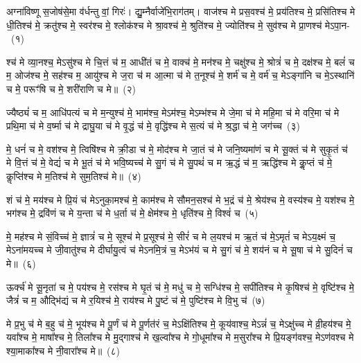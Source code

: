 \setcounter{anuvakam}{0}
अग्ना॑विष्णू स॒जोष॑से॒मा व॑र्धन्तु वां॒ गिरः॑। द्यु॒म्नैर्वाजे॑भि॒राग॑तम्। वाज॑श्च मे प्रस॒वश्च॑ मे॒ प्रय॑तिश्च मे॒ प्रसि॑तिश्च मे धी॒तिश्च॑ मे॒ क्रतु॑श्च मे॒ स्वर॑श्च मे॒ श्लोक॑श्च मे श्रा॒वश्च॑ मे॒ श्रुति॑श्च मे॒ ज्योति॑श्च मे॒ सुव॑श्च मे प्रा॒णश्च॑ मे\-ऽपा॒न-~(१)\ip

श्च॑ मे व्या॒नश्च॒ मे\-ऽसु॑श्च मे चि॒त्तं च॑ म॒ आधी॑तं च मे॒ वाक्च॑ मे॒ मन॑श्च मे॒ चक्षु॑श्च मे॒ श्रोत्रं॑ च मे॒ दक्ष॑श्च मे॒ बलं॑ च म॒ ओज॑श्च मे॒ सह॑श्च म॒ आयु॑श्च मे ज॒रा च॑ म आ॒त्मा च॑ मे त॒नूश्च॑ मे॒ शर्म॑ च मे॒ वर्म॑ च॒ मे\-ऽङ्गा॑नि च मे॒\-ऽस्थानि॑ च मे॒ परूꣳ॑षि च मे॒ शरी॑राणि च मे॥~(२)\ip

{\anuvakamend[{अ॒पा॒नस्त॒नूश्च॑ मे॒\-ऽष्टाद॑श च}]}

ज्यैष्ठ्यं॑ च म॒ आधि॑पत्यं च मे म॒न्युश्च॑ मे॒ भाम॑श्च॒ मे\-ऽम॑श्च॒ मे\-ऽम्भ॑श्च मे जे॒मा च॑ मे महि॒मा च॑ मे वरि॒मा च॑ मे प्रथि॒मा च॑ मे व॒र्ष्मा च॑ मे द्राघु॒या च॑ मे वृ॒द्धं च॑ मे॒ वृद्धि॑श्च मे स॒त्यं च॑ मे श्र॒द्धा च॑ मे॒ जग॑च्च~(३)\ip

मे॒ धनं॑ च मे॒ वश॑श्च मे॒ त्विषि॑श्च मे क्री॒डा च॑ मे॒ मोद॑श्च मे जा॒तं च॑ मे जनि॒ष्यमा॑णं च मे सू॒क्तं च॑ मे सुकृ॒तं च॑ मे वि॒त्तं च॑ मे॒ वेद्यं॑ च मे भू॒तं च॑ मे भवि॒ष्यच्च॑ मे सु॒गं च॑ मे सु॒पथं॑ च म ऋ॒द्धं च॑ म॒ ऋद्धि॑श्च मे कॢ॒प्तं च॑ मे॒ कॢप्ति॑श्च मे म॒तिश्च॑ मे सुम॒तिश्च॑ मे॥~(४)\ip

{\anuvakamend[{जग॒च्चर्द्धि॒श्चतु॑र्दश च}]}

शं च॑ मे॒ मय॑श्च मे प्रि॒यं च॑ मे\-ऽनुका॒मश्च॑ मे॒ काम॑श्च मे सौमन॒सश्च॑ मे भ॒द्रं च॑ मे॒ श्रेय॑श्च मे॒ वस्य॑श्च मे॒ यश॑श्च मे॒ भग॑श्च मे॒ द्रवि॑णं च मे य॒न्ता च॑ मे ध॒र्ता च॑ मे॒ क्षेम॑श्च मे॒ धृति॑श्च मे॒ विश्वं॑ च~(५)\ip

मे॒ मह॑श्च मे सं॒विच्च॑ मे॒ ज्ञात्रं॑ च मे॒ सूश्च॑ मे प्र॒सूश्च॑ मे॒ सीरं॑ च मे ल॒यश्च॑ म ऋ॒तं च॑ मे॒\-ऽमृतं॑ च मे\-ऽय॒क्ष्मं च॒ मे\-ऽना॑मयच्च मे जी॒वातु॑श्च मे दीर्घायु॒त्वं च॑ मे\-ऽनमि॒त्रं च॒ मे\-ऽभ॑यं च मे सु॒गं च॑ मे॒ शय॑नं च मे सू॒षा च॑ मे सु॒दिनं॑ च मे॥~(६)\ip

{\anuvakamend[{विश्वं॑ च॒ शय॑नम॒ष्टौ च॑}]}

ऊर्क्च॑ मे सू॒नृता॑ च मे॒ पय॑श्च मे॒ रस॑श्च मे घृ॒तं च॑ मे॒ मधु॑ च मे॒ सग्धि॑श्च मे॒ सपी॑तिश्च मे कृ॒षिश्च॑ मे॒ वृष्टि॑श्च मे॒ जैत्रं॑ च म॒ औद्भि॑द्यं च मे र॒यिश्च॑ मे॒ राय॑श्च मे पु॒ष्टं च॑ मे॒ पुष्टि॑श्च मे वि॒भु च॑~(७)\ip

मे प्र॒भु च॑ मे ब॒हु च॑ मे॒ भूय॑श्च मे पू॒र्णं च॑ मे पू॒र्णत॑रं च॒ मे\-ऽक्षि॑तिश्च मे॒ कूय॑वाश्च॒ मे\-ऽन्नं॑ च॒ मे\-ऽक्षु॑च्च मे व्री॒हय॑श्च मे॒ यवा᳚श्च मे॒ माषा᳚श्च मे॒ तिला᳚श्च मे मु॒द्गाश्च॑ मे ख॒ल्वा᳚श्च मे गो॒धूमा᳚श्च मे म॒सुरा᳚श्च मे प्रि॒यङ्ग॑वश्च॒ मे\-ऽण॑वश्च मे श्या॒माका᳚श्च मे नी॒वारा᳚श्च मे॥~(८)\ip

